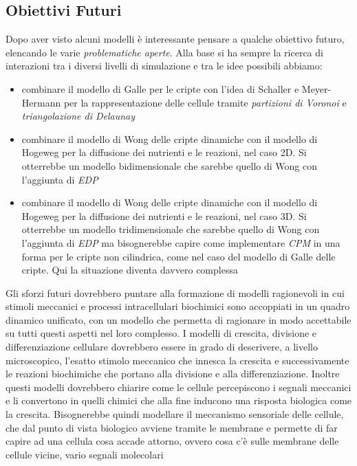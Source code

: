 \documentclass[a4paper,12pt, oneside]{book}
\begin{document}
\subsection{Obiettivi Futuri}
Dopo aver visto alcuni modelli è interessante pensare a qualche obiettivo
futuro, elencando le varie \textit{problematiche aperte}. Alla base si ha sempre
la ricerca di interazioni tra i diversi livelli di simulazione e tra le idee
possibili abbiamo:
\begin{itemize}
  \item combinare il modello di Galle per le cripte con l'idea di Schaller e
  Meyer-Hermann per la rappresentazione delle cellule tramite \textit{partizioni
    di Voronoi} e \textit{triangolazione di Delaunay}
  \item combinare il modello di Wong delle cripte dinamiche con il modello di
  Hogeweg per la diffusione dei nutrienti e le reazioni, nel caso 2D. Si
  otterrebbe un modello bidimensionale che sarebbe quello di Wong con
  l'aggiunta di \textit{EDP} 
  \item combinare il modello di Wong delle cripte dinamiche con il modello di
  Hogeweg per la diffusione dei nutrienti e le reazioni, nel caso 3D. Si
  otterrebbe un modello tridimensionale che sarebbe quello di Wong con
  l'aggiunta di \textit{EDP} ma bisognerebbe capire come implementare
  \textit{CPM} in una forma per le cripte non cilindrica, come nel caso del
  modello di Galle delle cripte. Qui la situazione diventa davvero complessa
\end{itemize}
Gli sforzi futuri dovrebbero puntare alla formazione di modelli ragionevoli in
cui stimoli meccanici e processi intracellulari biochimici sono accoppiati in un
quadro dinamico unificato, con un modello che permetta di ragionare in modo
accettabile su tutti questi aspetti nel loro complesso. I modelli di crescita,
divisione e differenziazione cellulare dovrebbero essere in grado di descrivere,
a livello microscopico, l'esatto stimolo meccanico che innesca la crescita e
successivamente le reazioni biochimiche che portano alla divisione e alla
differenziazione. Inoltre questi modelli dovrebbero chiarire come le cellule
percepiscono i segnali meccanici e li convertono in quelli chimici che alla fine
inducono una risposta biologica come la crescita. Bisognerebbe quindi modellare
il meccanismo sensoriale delle cellule, che dal punto di vista biologico avviene
tramite le membrane e permette di far capire ad una cellula cosa accade attorno,
ovvero cosa c'è sulle membrane delle cellule vicine, vario segnali molecolari
\end{document}
